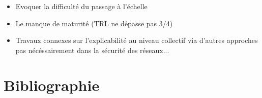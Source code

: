 \documentclass{article}
\begin{document}
\begin{itemize}

    \item Evoquer la difficulté du passage à l'échelle
    \item Le manque de maturité (TRL ne dépasse pas 3/4)
    \item Travaux connexes sur l'explicabilité au niveau collectif via d'autres approches pas nécéssairement dans la sécurité des réseaux...
\end{itemize}

\section{Bibliographie}
\end{document}
